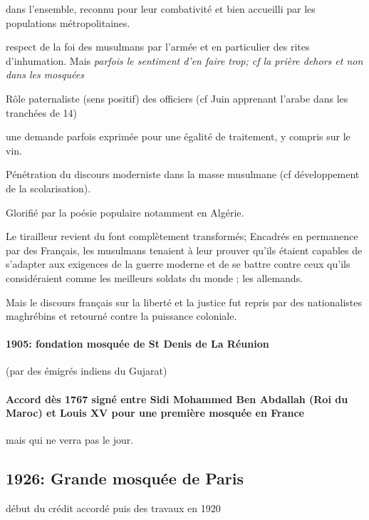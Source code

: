 \bi
\item dans l'ensemble, reconnu pour leur combativité et bien accueilli par les populations métropolitaines. 
\item respect de la foi des musulmans par l'armée et en particulier des rites d'inhumation. Mais \textit{parfois le sentiment d'en faire trop; cf la prière dehors et non dans les mosquées}
\item Rôle paternaliste (sens positif) des officiers (cf Juin apprenant l'arabe dans les tranchées de 14)
\item une demande parfois exprimée pour une égalité de traitement, y compris sur le vin.
\item Pénétration du discours moderniste dans la masse musulmane (cf développement de la scolarisation). 
\item Glorifié par la poésie populaire notamment en Algérie. 
\ei



\begin{Synthesis}
Le tirailleur revient du font complètement transformés; Encadrés en permanence par des Français, les musulmans tenaient à leur prouver qu'ils étaient capables de s'adapter aux exigences de la guerre moderne et de se battre contre ceux qu'ils considéraient comme les meilleurs soldats du monde  ; les allemands. 
\end{Synthesis}
Mais le discours français sur la liberté et la justice fut repris par des nationalistes maghrébins et retourné contre la puissance coloniale. 


\paragraph{1905: fondation mosquée de St Denis de La Réunion}
(par des émigrés indiens du Gujarat)

\paragraph{Accord dès 1767 signé entre Sidi Mohammed Ben Abdallah (Roi du Maroc) et Louis XV pour une première mosquée en France}
 mais qui ne verra pas le jour.


\subsection{1926: Grande mosquée de Paris}
début du crédit accordé puis des travaux en 1920

